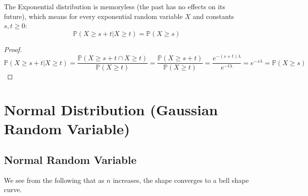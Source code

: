 The Exponential distribution is memoryless (the past has no effects on
its future), which means for every exponential random variable \(X\) and
constants \(s, t \geq 0\): 
\[
    \mathbb{P}(X \geq s + t \vert X \geq t) = \mathbb{P}(X \geq s)
\] 
\begin{proof}
    \[
        \mathbb{P}(X \geq s + t \vert X \geq t) = \dfrac{\mathbb{P}(X \geq s + t \cap X \geq t)}{\mathbb{P}(X \geq t)} = \dfrac{\mathbb{P}(X \geq s + t)}{\mathbb{P}(X \geq t)} = \dfrac{e^{-(s + t)\lambda}}{e^{-t\lambda}} = e^{-s\lambda} = \mathbb{P}(X \geq s)
    \]
\end{proof}

\section{Normal Distribution (Gaussian Random Variable)}
\subsection{Normal Random Variable}
We see from the following that as \(n\) increases, the shape converges to a bell shape curve.

